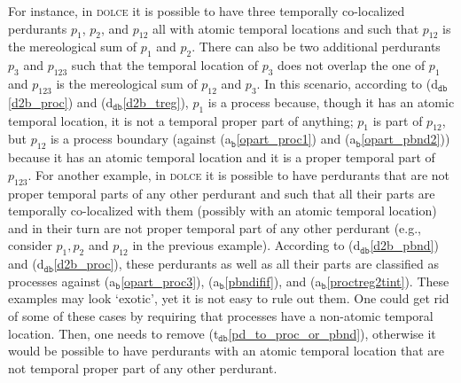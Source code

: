 \documentclass[ao]{iosart2x}
\newcommand{\nb}[1]{\textcolor{red}{$|$}\marginpar{\hspace*{-0cm}\parbox{20mm}{\scriptsize\raggedright\textcolor{red}{#1}}}}
\newcommand{\bfoAxLabel}{\textrm{a$_\texttt{b}$}}
\newcommand{\dbDefLabel}{\textrm{d$_\texttt{db}$}}
\newcommand{\dbThrLabel}{\textrm{t$_\texttt{db}$}}
\newcommand{\refbfoax}[1]{({\bfoAxLabel}\ref{#1})}
\newcommand{\refdbdf}[1]{({\dbDefLabel}\ref{#1})}
\newcommand{\refdbth}[1]{({\dbThrLabel}\ref{#1})}
\newcommand{\pr}[1]{\mathtt{#1}}
\newcommand{\dolce}{{\textsc{dolce}}}
\newcommand {\SUMd} {\ensuremath{\pr{SUM}}}
\begin{document}
For instance, in {\dolce} it is possible to have three temporally co-localized perdurants $p_1$, $p_2$, and $p_{12}$ all with atomic temporal locations and such that  $p_{12}$ is the mereological sum of $p_1$ and $p_2$. %
There can also be two additional perdurants $p_3$ and $p_{123}$ such that the temporal location of $p_3$ does not overlap the one of $p_1$ and $p_{123}$ is the mereological sum of $p_{12}$ and $p_{3}$. %
 In this scenario, according to \refdbdf{d2b_proc} and \refdbdf{d2b_treg}, $p_{1}$ is a process because, though it has an atomic temporal location, it is not a temporal proper part of anything; $p_1$ is part of $p_{12}$, but $p_{12}$ is a process boundary (against \refbfoax{opart_proc1} and \refbfoax{opart_pbnd2}) because it has an atomic temporal location and it is a proper temporal part of $p_{123}$. For another example, in {\dolce} it is possible to have perdurants that are not proper temporal parts of any other perdurant and such that all their parts are temporally co-localized with them (possibly with an atomic temporal location) and in their turn are not proper temporal part of any other perdurant (e.g., consider $p_1, p_2$ and $p_{12}$ in the previous example). %
 According to \refdbdf{d2b_pbnd} and \refdbdf{d2b_proc}, these perdurants as well as all their parts are classified as processes against \refbfoax{opart_proc3}, \refbfoax{pbndifif}, and \refbfoax{proctreg2tint}. These examples may look `exotic', yet it is not easy to rule out them. One could get rid of some of these cases by requiring that processes have a non-atomic temporal location. Then, one needs to remove \refdbth{pd_to_proc_or_pbnd}, otherwise it would be possible to have perdurants with an atomic temporal location that are not temporal proper part of any other perdurant. 
\end{document}
